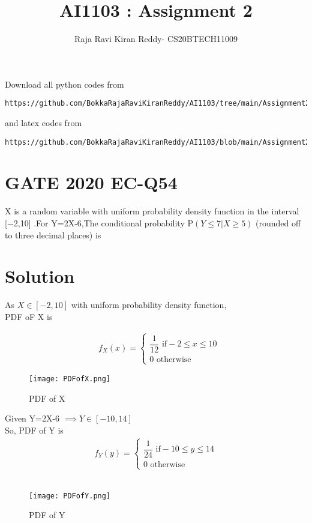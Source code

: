 \documentclass[journal,12pt,twocolumn]{IEEEtran}
\begin{document}
\let\vec\mathbf
\renewcommand{\thefigure}{\theproblem}
\def\putbox#1#2#3{\makebox[0in][l]{\makebox[#1][l]{}\raisebox{\baselineskip}[0in][0in]{\raisebox{#2}[0in][0in]{#3}}}}
     \def\rightbox#1{\makebox[0in][r]{#1}}
     \def\centbox#1{\makebox[0in]{#1}}
     \def\topbox#1{\raisebox{-\baselineskip}[0in][0in]{#1}}
     \def\midbox#1{\raisebox{-0.5\baselineskip}[0in][0in]{#1}}
\vspace{3cm}
\title{AI1103 : Assignment 2}
\author{Raja Ravi Kiran Reddy- CS20BTECH11009}
\maketitle
\newpage
\bigskip
\renewcommand{\thefigure}{\arabic{figure}}
\renewcommand{\thetable}{\arabic{table}}
Download all python codes from 
\begin{lstlisting}
https://github.com/BokkaRajaRaviKiranReddy/AI1103/tree/main/Assignment2/codes
\end{lstlisting}
%
and latex codes from 
%
\begin{lstlisting}
https://github.com/BokkaRajaRaviKiranReddy/AI1103/blob/main/Assignment2/Assignment2.tex
\end{lstlisting}
\section*{GATE 2020 EC-Q54}
X is a random variable with uniform probability density function in the interval
 [−2,10] .For Y=2X-6,The conditional probability P$(Y\leq7|X\geq5)$
(rounded off to three decimal places) is 
\section*{Solution}
As $X\in [-2,10]$ with uniform probability density function,\\
PDF oF X is

\begin{align}
\tag{54.1}
 &f_X(x)=\begin{cases}
  \dfrac{1}{12}  \text{  if} -2\leq x \leq10\\
    0 \text{  otherwise}
  \end{cases}
\end{align}
\begin{figure}[h]
    \centering
    \texttt{[image: PDFofX.png]}
    \caption{PDF of X}
    \label{fig:my_label}
\end{figure}

Given Y=2X-6
$\implies Y \in [-10,14] $\\
So, PDF of Y is 
\begin{align}
 \tag{54.2}
  f_Y(y)=\begin{cases}
  \dfrac{1}{24} \text{ if} -10\leq y \leq 14\\
  0  \text{   otherwise}
  \end{cases}
\end{align}\\
\begin{figure}[h]
    \centering
    \texttt{[image: PDFofY.png]}
    \caption{PDF of Y}
    \label{fig:my_label}
\end{figure}
\end{document}
